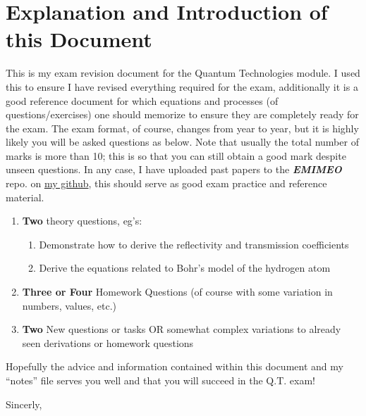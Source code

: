 \documentclass[colorlinks,11pt,a4paper,normalphoto,withhyper,ragged2e]{altareport}
\begin{document}
\section*{Explanation and Introduction of this Document}
This is my exam revision document for the Quantum Technologies module. I used this to ensure I have revised everything required for the exam, additionally it is a good reference document for which equations and processes (of questions/exercises) one should memorize to ensure they are completely ready for the exam. \linebreak
The exam format, of course, changes from year to year, but it is highly likely you will be asked questions as below. Note that usually the total number of marks is more than 10; this is so that you can still obtain a good mark despite unseen questions.\linebreak
In any case, I have uploaded past papers to the \textit{\textbf{EMIMEO}} repo. on \href{https://github.com/AS-Wilson}{my github}, this should serve as good exam practice and reference material. \linebreak
\begin{enumerate}[leftmargin=1cm]
	\item \textbf{Two} theory questions, eg's:
	\begin{enumerate}[leftmargin=1.5cm]
		\item Demonstrate how to derive the reflectivity and transmission coefficients
		\item Derive the equations related to Bohr's model of the hydrogen atom
	\end{enumerate}
	\item \textbf{Three or Four} Homework Questions (of course with some variation in numbers, values, etc.)
	\item \textbf{Two} New questions or tasks OR somewhat complex variations to already seen derivations or homework questions
\end{enumerate}

\vspace{0.25cm}

Hopefully the advice and information contained within this document and my ``notes'' file serves you well and that you will succeed in the Q.T. exam! \linebreak

\vspace{0.25cm}

Sincerly,\linebreak
\end{document}
